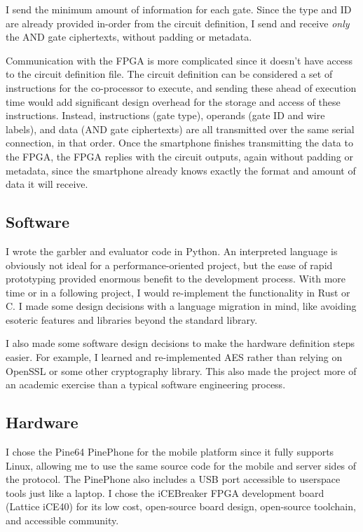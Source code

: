 I send the minimum amount of information for each gate. Since the type and ID are already provided in-order from the circuit definition, I send and receive \textit{only} the AND gate ciphertexts, without padding or metadata.

Communication with the FPGA is more complicated since it doesn't have access to the circuit definition file. The circuit definition can be considered a set of instructions for the co-processor to execute, and sending these ahead of execution time would add significant design overhead for the storage and access of these instructions. Instead, instructions (gate type), operands (gate ID and wire labels), and data (AND gate ciphertexts) are all transmitted over the same serial connection, in that order. Once the smartphone finishes transmitting the data to the FPGA, the FPGA replies with the circuit outputs, again without padding or metadata, since the smartphone already knows exactly the format and amount of data it will receive.


\subsection{Software}
I wrote the garbler and evaluator code in Python. An interpreted language is obviously not ideal for a performance-oriented project, but the ease of rapid prototyping provided enormous benefit to the development process. With more time or in a following project, I would re-implement the functionality in Rust or C. I made some design decisions with a language migration in mind, like avoiding esoteric features and libraries beyond the standard library.

I also made some software design decisions to make the hardware definition steps easier. For example, I learned and re-implemented AES rather than relying on OpenSSL or some other cryptography library. This also made the project more of an academic exercise than a typical software engineering process.


\subsection{Hardware}\label{sec:hw}
I chose the Pine64 PinePhone for the mobile platform since it fully supports Linux, allowing me to use the same source code for the mobile and server sides of the protocol. The PinePhone also includes a USB port accessible to userspace tools just like a laptop. I chose the iCEBreaker FPGA development board (Lattice iCE40) for its low cost, open-source board design, open-source toolchain, and accessible community.

